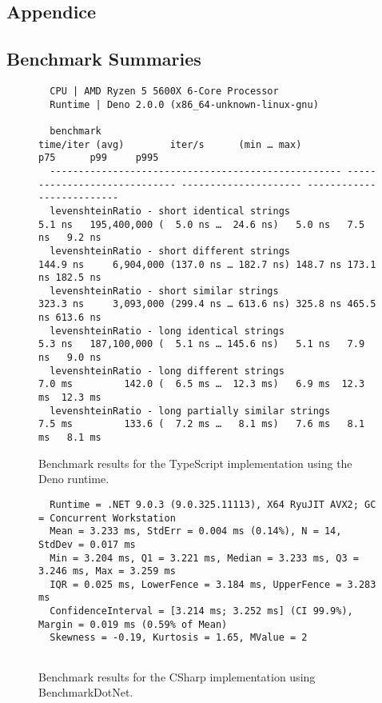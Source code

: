 \onecolumn
\begin{landscape}
\section{Appendice}

\subsection*{Benchmark Summaries}
\begin{figure}[H]
  \caption{Benchmark results for the TypeScript implementation using the Deno runtime.}
  \label{code:benchmark-typescript}
  \begin{verbatim}
  CPU | AMD Ryzen 5 5600X 6-Core Processor
  Runtime | Deno 2.0.0 (x86_64-unknown-linux-gnu)

  benchmark                                           time/iter (avg)        iter/s      (min … max)           p75      p99     p995
  --------------------------------------------------- ----------------------------- --------------------- --------------------------
  levenshteinRatio - short identical strings                   5.1 ns   195,400,000 (  5.0 ns …  24.6 ns)   5.0 ns   7.5 ns   9.2 ns
  levenshteinRatio - short different strings                 144.9 ns     6,904,000 (137.0 ns … 182.7 ns) 148.7 ns 173.1 ns 182.5 ns
  levenshteinRatio - short similar strings                   323.3 ns     3,093,000 (299.4 ns … 613.6 ns) 325.8 ns 465.5 ns 613.6 ns
  levenshteinRatio - long identical strings                    5.3 ns   187,100,000 (  5.1 ns … 145.6 ns)   5.1 ns   7.9 ns   9.0 ns
  levenshteinRatio - long different strings                    7.0 ms         142.0 (  6.5 ms …  12.3 ms)   6.9 ms  12.3 ms  12.3 ms
  levenshteinRatio - long partially similar strings            7.5 ms         133.6 (  7.2 ms …   8.1 ms)   7.6 ms   8.1 ms   8.1 ms
  \end{verbatim}
\end{figure}

\hfill

\begin{figure}[H]
  \caption{Benchmark results for the CSharp implementation using BenchmarkDotNet.}
  \label{code:benchmark-csharp}
  \begin{verbatim}
  Runtime = .NET 9.0.3 (9.0.325.11113), X64 RyuJIT AVX2; GC = Concurrent Workstation
  Mean = 3.233 ms, StdErr = 0.004 ms (0.14%), N = 14, StdDev = 0.017 ms
  Min = 3.204 ms, Q1 = 3.221 ms, Median = 3.233 ms, Q3 = 3.246 ms, Max = 3.259 ms
  IQR = 0.025 ms, LowerFence = 3.184 ms, UpperFence = 3.283 ms
  ConfidenceInterval = [3.214 ms; 3.252 ms] (CI 99.9%), Margin = 0.019 ms (0.59% of Mean)
  Skewness = -0.19, Kurtosis = 1.65, MValue = 2


\end{verbatim}
\end{figure}
\end{landscape}
